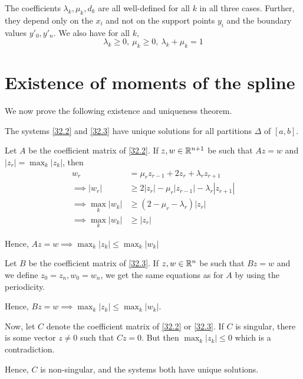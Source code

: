 \begin{rmk}
The coefficients $ \lambda_k, \mu_k, d_k $ are all well-defined for all $ k $ in all three cases. Further, they depend only on the $ x_i $ and not on the support points $ y_i $ and the boundary values $ y'_0, y'_n $. We also have for all $ k $,
\[ \lambda_k \geq 0, \ \mu_k \geq 0, \ \lambda_k + \mu_k = 1 \]
\end{rmk}

\section{Existence of moments of the spline}
We now prove the following existence and uniqueness theorem.

\begin{thm}
The systems \eqref{32.2} and \eqref{32.3} have unique solutions for all partitions $ \Delta $ of $ [a,b] $.
\end{thm}
\begin{prf}
Let $ A $ be the coefficient matrix of \eqref{32.2}. If $ z, w \in \mathbb{R}^{n+1} $ be such that $ Az = w $ and $ |z_r| = \max_{k}|z_k| $, then
\begin{align*}
	w_r &= \mu_r z_{r-1} + 2z_r + \lambda_r z_{r+1} \\
	\implies |w_r| &\geq 2|z_r| - \mu_r|z_{r-1}| - \lambda_r|z_{r+1}| \tag{Triangle inequality, $ \lambda_k \geq 0, \mu_k \geq 0 $}\\
	\implies \max_k|w_k| &\geq (2-\mu_r-\lambda_r)|z_r| \tag{Definition of $ z_r $} \\
	\implies \max_k|w_k| &\geq |z_r| \tag{$ \lambda_k + \mu_k = 1 $}
\end{align*}

Hence, $ Az = w \implies \max_k|z_k| \leq \max_k |w_k| $

Let $ B $ be the coefficient matrix of \eqref{32.3}. If $ z, w \in \mathbb{R}^n $ be such that $ Bz = w $ and we define $ z_0 = z_n, w_0 = w_n $, we get the same equations as for $ A $ by using the periodicity. 

Hence, $ Bz = w \implies \max_k|z_k| \leq \max_k |w_k| $. 

Now, let $ C $ denote the coefficient matrix of \eqref{32.2} or \eqref{32.3}. If $ C $ is singular, there is some vector $ z \neq 0 $ such that $ Cz = 0 $. But then $ \max_k|z_k| \leq 0 $ which is a contradiction.

Hence, $ C $ is non-singular, and the systems both have unique solutions.
\end{prf}